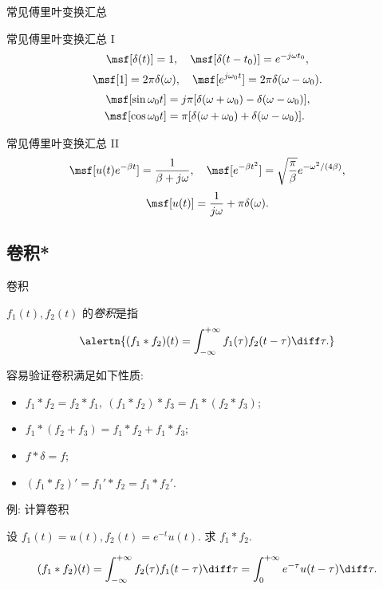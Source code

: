 \begin{frame}{常见傅里叶变换汇总}
	\onslide<+->
	\begin{second}{常见傅里叶变换汇总 I}
		\[\msf[\delta(t)]=1,\quad \msf[\delta(t-t_0)]=e^{-j\omega t_0},\]
		\[\msf[1]=2\pi\delta(\omega),\quad \msf[e^{j\omega_0 t}]=2\pi\delta(\omega-\omega_0).\]
		\begin{align*}
		\msf[\sin \omega_0t]&=j\pi[\delta(\omega+\omega_0)-\delta(\omega-\omega_0)],\\
		\msf[\cos{\omega_0 t}]&=\pi[\delta(\omega+\omega_0)+\delta(\omega-\omega_0)].
		\end{align*}
	\end{second}

	\onslide<+->
	\begin{main}{常见傅里叶变换汇总 II}
		\[\msf[u(t)e^{-\beta t}]=\dfrac1{\beta+j\omega},\quad
		\msf[e^{-\beta t^2}]=\sqrt{\dfrac\pi\beta}e^{-\omega^2/(4\beta)},\]
		\[\msf[u(t)]=\dfrac1{j\omega}+\pi\delta(\omega).\]
	\end{main}
\end{frame}


\subsection{卷积*}
\begin{frame}{卷积\noexer}
	\onslide<+->
	\begin{definition}
		$f_1(t),f_2(t)$ 的\emph{卷积}是指
		\[\alertn{(f_1\ast f_2)(t)=\int_{-\infty}^{+\infty} f_1(\tau)f_2(t-\tau)\diff \tau.}\]
	\end{definition}

	\onslide<+->
	容易验证卷积满足如下性质:
	\begin{itemize}\bf
		\item $f_1\ast f_2=f_2\ast f_1,\ (f_1\ast f_2)\ast f_3=f_1\ast(f_2\ast f_3)$;
		\item $f_1\ast(f_2+f_3)=f_1\ast f_2+f_1\ast f_3$;
		\item $f\ast\delta=f$;
		\item $(f_1\ast f_2)'=f_1'\ast f_2=f_1\ast f_2'$.
	\end{itemize}
\end{frame}


\begin{frame}{例: 计算卷积\noexer}
	\onslide<+->
	\begin{example}
		设 $f_1(t)=u(t),f_2(t)=e^{-t}u(t)$. 求 $f_1\ast f_2$.
	\end{example}

	\onslide<+->
	\begin{solution}
			\[(f_1\ast f_2)(t)=\int_{-\infty}^{+\infty} f_2(\tau)f_1(t-\tau)\diff \tau=\int_0^{+\infty} e^{-\tau}u(t-\tau)\diff \tau.\]
		\onslide<+->{故 $(f_1\ast f_2)(t)=(1-e^{-t})u(t)$.
		}
	\end{solution}
\end{frame}


